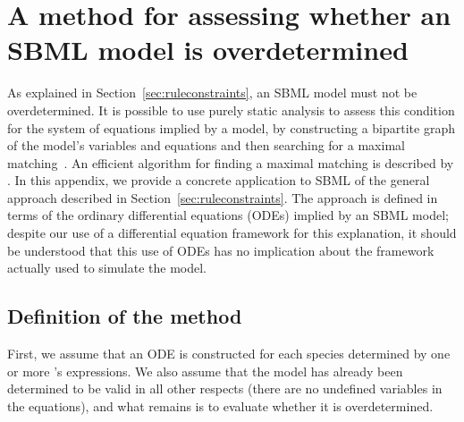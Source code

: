 
\section{A method for assessing whether an SBML model is overdetermined}
\label{apdx:assessing-overdetermined}

As explained in Section~\ref{sec:ruleconstraints}, an SBML model
must not be overdetermined.  It is possible to use purely static
analysis to assess this condition for the system of equations implied by a
model, by constructing a bipartite graph of the model's variables
and equations and then searching for a maximal
matching~\citep{chartrand_1977}.  An efficient algorithm for finding
a maximal matching is described by \cite{hopcroft:1973}.  In this
appendix, we provide a concrete application to SBML of the general
approach described in Section~\ref{sec:ruleconstraints}.  The
approach is defined in terms of the ordinary differential
equations (ODEs) implied by an SBML model; 
despite our use of a differential equation framework for
  this explanation, it should be understood that this
use of ODEs has no implication about the framework
  actually used to simulate the model.


\subsection*{Definition of the method}
\label{sec:overdetermined-method}

First, we assume that an ODE is constructed for each species
determined by one or more \Reaction's \KineticLaw {}
expressions.  We also assume that the model has already been
determined to be valid in all other respects (\eg there are no
undefined variables in the equations), and what remains is to
evaluate whether it is overdetermined.

